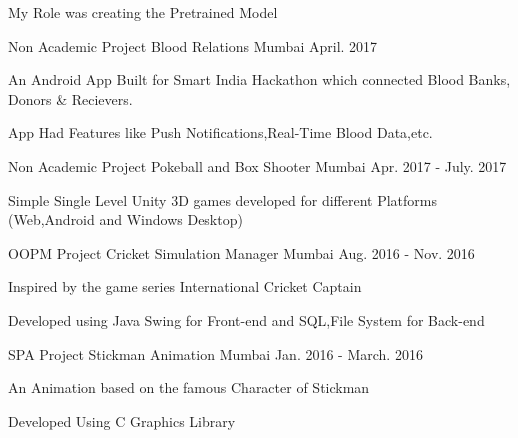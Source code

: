 \begin{cventries}
{\begin{cvitems}
	\item {My Role was creating the Pretrained Model}
      \end{cvitems}
    }
  \cventry
    {Non Academic Project} %
    {Blood Relations} %
    {Mumbai} %
    {April. 2017} %
    {
      \begin{cvitems} %
        \item {An Android App Built for Smart India Hackathon which connected Blood Banks, Donors \& Recievers.}
	\item {App Had Features like Push Notifications,Real-Time Blood Data,etc.}
      \end{cvitems}
    }
  \cventry
    {Non Academic Project} %
    {Pokeball and Box Shooter} %
    {Mumbai} %
    {Apr. 2017 - July. 2017} %
    {
      \begin{cvitems} %
        \item {Simple Single Level Unity 3D games developed for different Platforms (Web,Android and Windows Desktop)}
      \end{cvitems}
    }

  \cventry
    {OOPM Project} %
    {Cricket Simulation Manager} %
    {Mumbai} %
    {Aug. 2016 - Nov. 2016} %
    {
      \begin{cvitems} %
        \item {Inspired by the game series International Cricket Captain}
	\item {Developed using Java Swing for Front-end and SQL,File System for Back-end}
      \end{cvitems}
    }

  \cventry
    {SPA Project} %
    {Stickman Animation} %
    {Mumbai} %
    {Jan. 2016 - March. 2016} %
    {
      \begin{cvitems} %
        \item {An Animation based on the famous Character of Stickman}
	\item {Developed Using C Graphics Library}
      \end{cvitems}
    }

    
\end{cventries}
